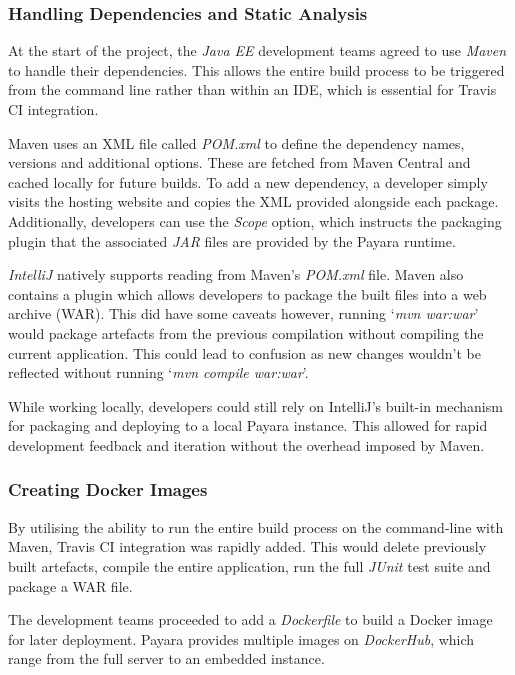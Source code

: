 \subsubsection{Handling Dependencies and Static Analysis}
At the start of the project, the \textit{Java EE} development teams agreed to use \textit{Maven}\cite{Maven} to handle their dependencies. This allows the entire build process to be triggered from the command line rather than within an IDE, which is essential for Travis CI integration.

Maven uses an XML file called \textit{POM.xml} to define the dependency names, versions and additional options. These are fetched from Maven Central and cached locally for future builds. To add a new dependency, a developer simply visits the hosting website and copies the XML provided alongside each package. Additionally, developers can use the \textit{Scope} option, which instructs the packaging plugin that the associated \textit{JAR} files are provided by the Payara runtime.

\textit{IntelliJ} natively supports reading from Maven's \textit{POM.xml} file. Maven also contains a plugin which allows developers to package the built files into a web archive (WAR). This did have some caveats however, running `\textit{mvn war:war}' would package artefacts from the previous compilation without compiling the current application. This could lead to confusion as new changes wouldn't be reflected without running `\textit{mvn compile war:war}'.

While working locally, developers could still rely on IntelliJ's built-in mechanism for packaging and deploying to a local Payara instance. This allowed for rapid development feedback and iteration without the overhead imposed by Maven.

\subsubsection{Creating Docker Images}
By utilising the ability to run the entire build process on the command-line with Maven, Travis CI integration was rapidly added. This would delete previously built artefacts, compile the entire application, run the full \textit{JUnit} test suite and package a WAR file.

The development teams proceeded to add a \textit{Dockerfile} to build a Docker image for later deployment. Payara provides multiple images on \textit{DockerHub}\cite{DockerHub_Payara}, which range from the full server to an embedded instance.

